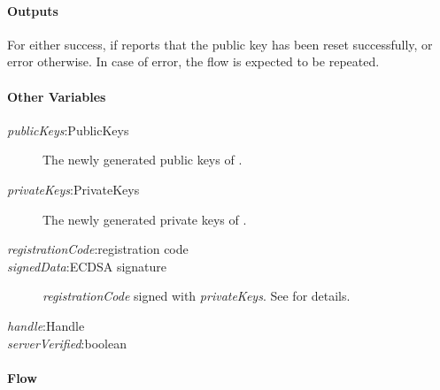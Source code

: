 \documentclass[a4paper,10pt,draft]{article}
\newcommand{\signedData}{\emph{signedData}}
\newcommand{\serverVerified}{\emph{serverVerified}}
\newcommand{\handle}{\emph{handle}}
\newcommand{\registrationCode}{\emph{registrationCode}}
\newcommand{\privateKeys}{\emph{privateKeys}}
\newcommand{\publicKeys}{\emph{publicKeys}}
\begin{document}
\paragraph{Outputs}
For \Client{} either success, if \Server{} reports that the public key has 
been reset successfully, or error otherwise. In case of error, the flow is 
expected to be repeated.

\paragraph{Other Variables}
\SpecialItem
\begin{description}
 \item[\publicKeys{}:PublicKeys] The newly generated public keys of 
\Client{}. 
 \item[\privateKeys{}:PrivateKeys] The newly generated private keys of 
\Client{}.
 \item[\registrationCode{}:registration code]
 \item[\signedData{}:ECDSA signature] \registrationCode{} signed with
\privateKeys{}. See \cite{crypto_spec} for details.
 \item[\handle{}:Handle]
 \item[\serverVerified:boolean]
\end{description}

\paragraph{Flow}
\end{document}
